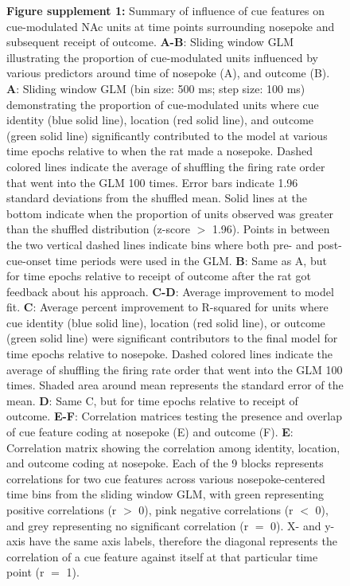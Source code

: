 \documentclass[11pt]{article}
\newcommand{\bsf}[1]{\textbf{#1}}
\begin{document}
\begin{figure}[ht!]
\caption*{\bsf{Figure supplement 1:} {\color{red} Summary of influence of cue features on cue-modulated NAc units at time points surrounding nosepoke and subsequent receipt of outcome. \bsf{A-B}: Sliding window GLM illustrating the proportion of cue-modulated units influenced by various predictors around time of nosepoke (A), and outcome (B). \bsf{A}: Sliding window GLM (bin size: 500 ms; step size: 100 ms) demonstrating the proportion of cue-modulated units where cue identity (blue solid line), location (red solid line), and outcome (green solid line) significantly contributed to the model at various time epochs relative to when the rat made a nosepoke. Dashed colored lines indicate the average of shuffling the firing rate order that went into the GLM 100 times. Error bars indicate 1.96 standard deviations from the shuffled mean. Solid lines at the bottom indicate when the proportion of units observed was greater than the shuffled distribution (z-score $>$ 1.96). Points in between the two vertical dashed lines indicate bins where both pre- and post-cue-onset time periods were used in the GLM. \bsf{B}: Same as A, but for time epochs relative to receipt of outcome after the rat got feedback about his approach. \bsf{C-D}: Average improvement to model fit. \bsf{C}: Average percent improvement to R-squared for units where cue identity (blue solid line), location (red solid line), or outcome (green solid line) were significant contributors to the final model for time epochs relative to nosepoke. Dashed colored lines indicate the average of shuffling the firing rate order that went into the GLM 100 times. Shaded area around mean represents the standard error of the mean. \bsf{D}: Same C, but for time epochs relative to receipt of outcome. \bsf{E-F}: Correlation matrices testing the presence and overlap of cue feature coding at nosepoke (E) and outcome (F). \bsf{E}: Correlation matrix showing the correlation among identity, location, and outcome coding at nosepoke. Each of the 9 blocks represents correlations for two cue features across various nosepoke-centered time bins from the sliding window GLM, with green representing positive correlations (r $>$ 0), pink negative correlations (r $<$ 0), and grey representing no significant correlation (r $=$ 0). X- and y-axis have the same axis labels, therefore the diagonal represents the correlation of a cue feature against itself at that particular time point (r $=$ 1).}}
\label{fig:Q2SUPP1}
\end{figure} \clearpage
\end{document}
